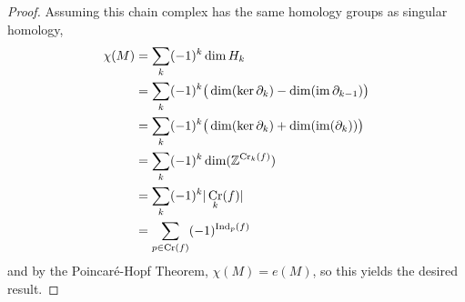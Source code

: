 \documentclass{amsart}
\DeclareMathOperator{\Cr}{\mathrm{Cr}}
\begin{document}
	\begin{proof} Assuming this chain complex has the same homology groups as singular homology, 
		\begin{align*}
			\chi(M) &= \sum_k (-1)^k\dim H_k\\
					&= \sum_k (-1)^k \big(\dim(\ker\partial_k) - \dim(\im\partial_{k-1})\big)\\
					&= \sum_k (-1)^k \big(\dim(\ker\partial_{k}) + \dim(\im(\partial_k))\big)\\
					&= \sum_k (-1)^k \dim( \Z^{\Cr_k(f)})\\
					&= \sum_k (-1)^k |\Cr_k(f)|\\
					&= \sum_{p\in \Cr(f)} (-1)^{\Ind_p(f)}
		\end{align*}
		and by the Poincar\'e-Hopf Theorem, $\chi(M)=e(M)$, so this yields the desired result.
	\end{proof}
\end{document}
